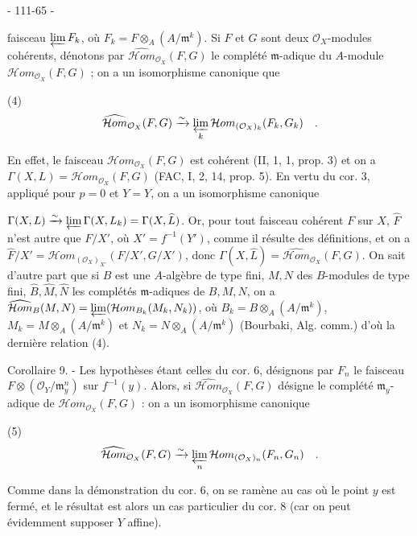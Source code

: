 
- 111-65 -

faisceau $\varprojlim F_k$, où $F_k = F \otimes_A (A/\mathfrak{m}^k)$. Si $F$ et $G$ sont deux $\mathcal{O}_X$-modules cohérents, dénotons par $\widehat{\mathcal{H}om}_{\mathcal{O}_X}(F, G)$ le complété $\mathfrak{m}$-adique du $A$-module $\mathcal{H}om_{\mathcal{O}_X}(F, G)$ ; on a un isomorphisme canonique que

(4) $$\widehat{\mathcal{H}om}_{\mathcal{O}_X}(F, G) \xrightarrow{\sim} \varprojlim_k \mathcal{H}om_{(\mathcal{O}_X)_k}(F_k, G_k) \quad .$$

En effet, le faisceau $\mathcal{H}om_{\mathcal{O}_X}(F, G)$ est cohérent (II, 1, 1, prop. 3) et on a $\Gamma(X, L) = \mathcal{H}om_{\mathcal{O}_X}(F, G)$ (FAC, I, 2, 14, prop. 5). En vertu du cor. 3, appliqué pour $p=0$ et $Y=Y$, on a un isomorphisme canonique

$\Gamma(X, L) \xrightarrow{\sim} \varprojlim \Gamma(X, L_k) = \Gamma(X, \widehat{L})$. Or, pour tout faisceau cohérent $F$ sur $X$, $\widehat{F}$ n'est autre que $F/X'$, où $X' = f^{-1}(Y')$, comme il résulte des définitions, et on a $\widehat{F}/X' = \mathcal{H}om_{(\mathcal{O}_X)_{X'}} (F/X', G/X')$, donc $\Gamma(X, \widehat{L}) = \widehat{\mathcal{H}om}_{\mathcal{O}_X}(F, G)$. On sait d'autre part que si $B$ est une $A$-algèbre de type fini, $M, N$ des $B$-modules de type fini, $\widehat{B}, \widehat{M}, \widehat{N}$ les complétés $\mathfrak{m}$-adiques de $B, M, N$, on a $\widehat{\mathcal{H}om}_B(M, N) = \varprojlim (\mathcal{H}om_{B_k}(M_k, N_k))$, où $B_k = B \otimes_A (A/\mathfrak{m}^k)$, $M_k = M \otimes_A (A/\mathfrak{m}^k)$ et $N_k = N \otimes_A (A/\mathfrak{m}^k)$ (Bourbaki, Alg. comm.) d'où la dernière relation (4).

Corollaire 9. - Les hypothèses étant celles du cor. 6, désignons par $F_n$ le faisceau $F \otimes (\mathcal{O}_Y/\mathfrak{m}_y^n)$ sur $f^{-1}(y)$. Alors, si $\widehat{\mathcal{H}om}_{\mathcal{O}_X}(F, G)$ désigne le complété $\mathfrak{m}_y$-adique de $\mathcal{H}om_{\mathcal{O}_X}(F, G)$ : on a un isomorphisme canonique

(5) $$\widehat{\mathcal{H}om}_{\mathcal{O}_X}(F, G) \xrightarrow{\sim} \varprojlim_n \mathcal{H}om_{(\mathcal{O}_X)_n}(F_n, G_n) \quad .$$

Comme dans la démonstration du cor. 6, on se ramène au cas où le point $y$ est fermé, et le résultat est alors un cas particulier du cor. 8 (car on peut évidemment supposer $Y$ affine).

